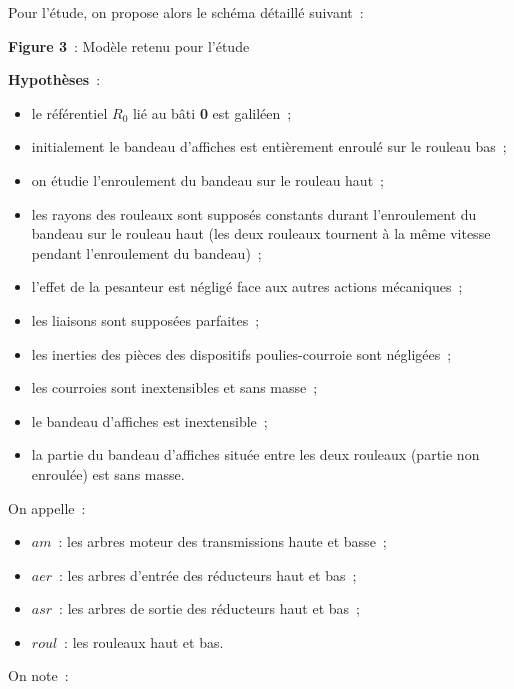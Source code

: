Pour l'étude, on propose alors le schéma détaillé suivant~:

\textbf{Figure 3}~: Modèle retenu pour l'étude

\textbf{Hypothèses}~:

\begin{itemize}
\item
  le référentiel \(R_{0}\) lié au bâti \textbf{0} est galiléen~;
\item
  initialement le bandeau d'affiches est entièrement enroulé sur le rouleau bas~;
\item
  on étudie l'enroulement du bandeau sur le rouleau haut~;
\item
  les rayons des rouleaux sont supposés constants durant l'enroulement du bandeau sur le rouleau haut (les deux rouleaux tournent à la même vitesse pendant l'enroulement du bandeau)~;
\item
  l'effet de la pesanteur est négligé face aux autres actions mécaniques~;
\item
  les liaisons sont supposées parfaites~;
\item
  les inerties des pièces des dispositifs poulies-courroie sont négligées~;
\item
  les courroies sont inextensibles et sans masse~;
\item
  le bandeau d'affiches est inextensible~;
\item
  la partie du bandeau d'affiches située entre les deux rouleaux (partie non enroulée) est sans masse.
\end{itemize}

On appelle~:

\begin{itemize}
\item
  \(am\)~: les arbres moteur des transmissions haute et basse~;
\item
  \(aer\)~: les arbres d'entrée des réducteurs haut et bas~;
\item
  \(asr\)~: les arbres de sortie des réducteurs haut et bas~;
\item
  \(roul\)~: les rouleaux haut et bas.
\end{itemize}

On note~:

